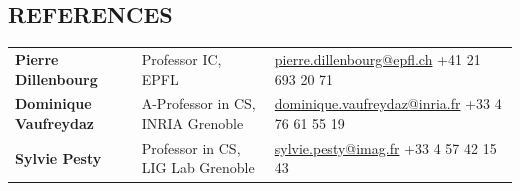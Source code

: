 
\subsection{REFERENCES}
\vspace{2pt}

\noindent
\begin{tabularx}{\textwidth}{@{}lll@{}}
\textbf{Pierre Dillenbourg}      & Professor IC, EPFL            & \href{mailto:pierre.dillenbourg@epfl.ch}{pierre.dillenbourg@epfl.ch} \quad +41 21 693 20 71 \\[3pt]
\textbf{Dominique Vaufreydaz}    & A-Professor in CS, INRIA Grenoble & \href{mailto:dominique.vaufreydaz@inria.fr}{dominique.vaufreydaz@inria.fr} \quad +33 4 76 61 55 19 \\[3pt]
\textbf{Sylvie Pesty}            & Professor in CS, LIG Lab Grenoble & \href{mailto:sylvie.pesty@imag.fr}{sylvie.pesty@imag.fr} \quad +33 4 57 42 15 43 \\
\end{tabularx}
